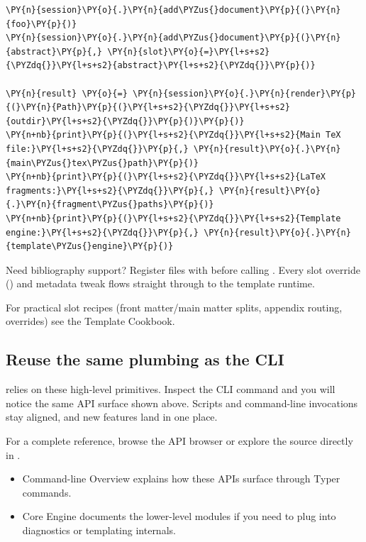\documentclass[a4paper,twoside]{article}
\begin{document}
\begin{tscode}[lang=python, engine=pygments]
\begin{Verbatim}[commandchars=\\\{\},breaklines, breakanywhere, commandchars=\\\{\}]
\PY{n}{session}\PY{o}{.}\PY{n}{add\PYZus{}document}\PY{p}{(}\PY{n}{foo}\PY{p}{)}
\PY{n}{session}\PY{o}{.}\PY{n}{add\PYZus{}document}\PY{p}{(}\PY{n}{abstract}\PY{p}{,} \PY{n}{slot}\PY{o}{=}\PY{l+s+s2}{\PYZdq{}}\PY{l+s+s2}{abstract}\PY{l+s+s2}{\PYZdq{}}\PY{p}{)}

\PY{n}{result} \PY{o}{=} \PY{n}{session}\PY{o}{.}\PY{n}{render}\PY{p}{(}\PY{n}{Path}\PY{p}{(}\PY{l+s+s2}{\PYZdq{}}\PY{l+s+s2}{outdir}\PY{l+s+s2}{\PYZdq{}}\PY{p}{)}\PY{p}{)}
\PY{n+nb}{print}\PY{p}{(}\PY{l+s+s2}{\PYZdq{}}\PY{l+s+s2}{Main TeX file:}\PY{l+s+s2}{\PYZdq{}}\PY{p}{,} \PY{n}{result}\PY{o}{.}\PY{n}{main\PYZus{}tex\PYZus{}path}\PY{p}{)}
\PY{n+nb}{print}\PY{p}{(}\PY{l+s+s2}{\PYZdq{}}\PY{l+s+s2}{LaTeX fragments:}\PY{l+s+s2}{\PYZdq{}}\PY{p}{,} \PY{n}{result}\PY{o}{.}\PY{n}{fragment\PYZus{}paths}\PY{p}{)}
\PY{n+nb}{print}\PY{p}{(}\PY{l+s+s2}{\PYZdq{}}\PY{l+s+s2}{Template engine:}\PY{l+s+s2}{\PYZdq{}}\PY{p}{,} \PY{n}{result}\PY{o}{.}\PY{n}{template\PYZus{}engine}\PY{p}{)}
\end{Verbatim}
\end{tscode}
Need bibliography support? Register  files with  before calling . Every slot override () and metadata tweak flows straight through to the template runtime.
\begin{tscallout}[kind=note]
For practical slot recipes (front matter/main matter splits, appendix routing, overrides) see the Template Cookbook.
\end{tscallout}
\subsection{Reuse the same plumbing as the CLI}
 relies on these high-level primitives. Inspect the CLI command and you will notice the same API surface shown above. Scripts and command-line invocations stay aligned, and new features land in one place.

For a complete reference, browse the API browser or explore the source directly in .
\begin{tscallout}[kind=seealso]
\begin{itemize}
\item Command-line Overview explains how these APIs surface through Typer commands.
\item Core Engine documents the lower-level modules if you need to plug into diagnostics or templating internals.
\end{itemize}
\end{tscallout}
\end{document}
